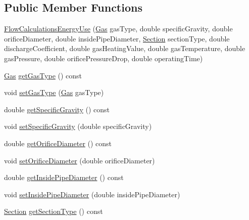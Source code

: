 \subsection*{Public Member Functions}
\begin{DoxyCompactItemize}
\item 
\hyperlink{class_flow_calculations_energy_use_a37514554d3cb04764b27d648966de471}{Flow\+Calculations\+Energy\+Use} (\hyperlink{class_flow_calculations_energy_use_a840d5a836e7b05d6791b79bace4440f2}{Gas} gas\+Type, double specific\+Gravity, double orifice\+Diameter, double inside\+Pipe\+Diameter, \hyperlink{class_flow_calculations_energy_use_afbabab0da698748de91369a5dfc7662a}{Section} section\+Type, double discharge\+Coefficient, double gas\+Heating\+Value, double gas\+Temperature, double gas\+Pressure, double orifice\+Pressure\+Drop, double operating\+Time)
\item 
\hyperlink{class_flow_calculations_energy_use_a840d5a836e7b05d6791b79bace4440f2}{Gas} \hyperlink{class_flow_calculations_energy_use_a04df0a0c655c4aef3d5a4539d57fec2e}{get\+Gas\+Type} () const
\item 
void \hyperlink{class_flow_calculations_energy_use_a01b38762426c50e6ab22aefd674f30df}{set\+Gas\+Type} (\hyperlink{class_flow_calculations_energy_use_a840d5a836e7b05d6791b79bace4440f2}{Gas} gas\+Type)
\item 
double \hyperlink{class_flow_calculations_energy_use_adc3ac2406e00a75c33be0a6a66153da3}{get\+Specific\+Gravity} () const
\item 
void \hyperlink{class_flow_calculations_energy_use_abafa34d337124a1487fb0c871ea8a24a}{set\+Specific\+Gravity} (double specific\+Gravity)
\item 
double \hyperlink{class_flow_calculations_energy_use_a71c34f09ec3524db321b8934930700c5}{get\+Orifice\+Diameter} () const
\item 
void \hyperlink{class_flow_calculations_energy_use_a31116dc6381ad3fd9d2214da7ee3dd1b}{set\+Orifice\+Diameter} (double orifice\+Diameter)
\item 
double \hyperlink{class_flow_calculations_energy_use_a9042dce2938208358fe38ed8a726ca65}{get\+Inside\+Pipe\+Diameter} () const
\item 
void \hyperlink{class_flow_calculations_energy_use_a616486580460b616a7a8c4935119cd6c}{set\+Inside\+Pipe\+Diameter} (double inside\+Pipe\+Diameter)
\item 
\hyperlink{class_flow_calculations_energy_use_afbabab0da698748de91369a5dfc7662a}{Section} \hyperlink{class_flow_calculations_energy_use_ae88cc4f93028907c4c12e8925f63266b}{get\+Section\+Type} () const

\end{DoxyCompactItemize}
